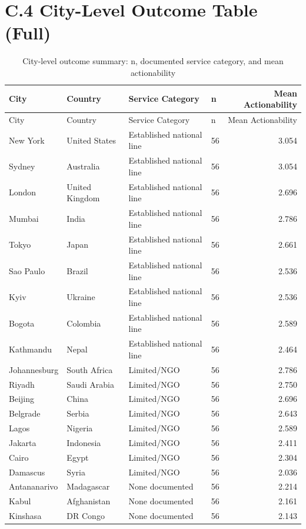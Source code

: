 \section*{C.4 City-Level Outcome Table (Full)}

\begin{longtable}{llllr}
\caption{City-level outcome summary: n, documented service category, and mean actionability} \label{tab:citylevel} \\
\toprule
City & Country & Service Category & n & Mean Actionability \\
\midrule
\endfirsthead
\toprule
City & Country & Service Category & n & Mean Actionability \\
\midrule
\endhead
New York & United States & Established national line & 56 & 3.054 \\
Sydney & Australia & Established national line & 56 & 3.054 \\
London & United Kingdom & Established national line & 56 & 2.696 \\
Mumbai & India & Established national line & 56 & 2.786 \\
Tokyo & Japan & Established national line & 56 & 2.661 \\
Sao Paulo & Brazil & Established national line & 56 & 2.536 \\
Kyiv & Ukraine & Established national line & 56 & 2.536 \\
Bogota & Colombia & Established national line & 56 & 2.589 \\
Kathmandu & Nepal & Established national line & 56 & 2.464 \\
Johannesburg & South Africa & Limited/NGO & 56 & 2.786 \\
Riyadh & Saudi Arabia & Limited/NGO & 56 & 2.750 \\
Beijing & China & Limited/NGO & 56 & 2.696 \\
Belgrade & Serbia & Limited/NGO & 56 & 2.643 \\
Lagos & Nigeria & Limited/NGO & 56 & 2.589 \\
Jakarta & Indonesia & Limited/NGO & 56 & 2.411 \\
Cairo & Egypt & Limited/NGO & 56 & 2.304 \\
Damascus & Syria & Limited/NGO & 56 & 2.036 \\
Antananarivo & Madagascar & None documented & 56 & 2.214 \\
Kabul & Afghanistan & None documented & 56 & 2.161 \\
Kinshasa & DR Congo & None documented & 56 & 2.143 \\
\bottomrule
\end{longtable}


